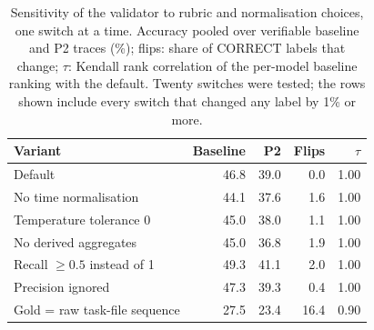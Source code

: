 \begin{table}[!tbp]
\centering
\caption{Sensitivity of the validator to rubric and normalisation choices, one switch at a time. Accuracy pooled over verifiable baseline and P2 traces (\%); flips: share of CORRECT labels that change; $\tau$: Kendall rank correlation of the per-model baseline ranking with the default. Twenty switches were tested; the rows shown include every switch that changed any label by 1\% or more.}
\label{tab:robustness}
\small
\begin{tabular}{@{}lrrrr@{}}
\toprule
Variant & Baseline & P2 & Flips & $\tau$ \\
\midrule
Default & 46.8 & 39.0 & 0.0 & 1.00 \\
No time normalisation & 44.1 & 37.6 & 1.6 & 1.00 \\
Temperature tolerance 0 & 45.0 & 38.0 & 1.1 & 1.00 \\
No derived aggregates & 45.0 & 36.8 & 1.9 & 1.00 \\
Recall $\geq 0.5$ instead of 1 & 49.3 & 41.1 & 2.0 & 1.00 \\
Precision ignored & 47.3 & 39.3 & 0.4 & 1.00 \\
\midrule
Gold = raw task-file sequence & 27.5 & 23.4 & 16.4 & 0.90 \\
\bottomrule
\end{tabular}
\end{table}
